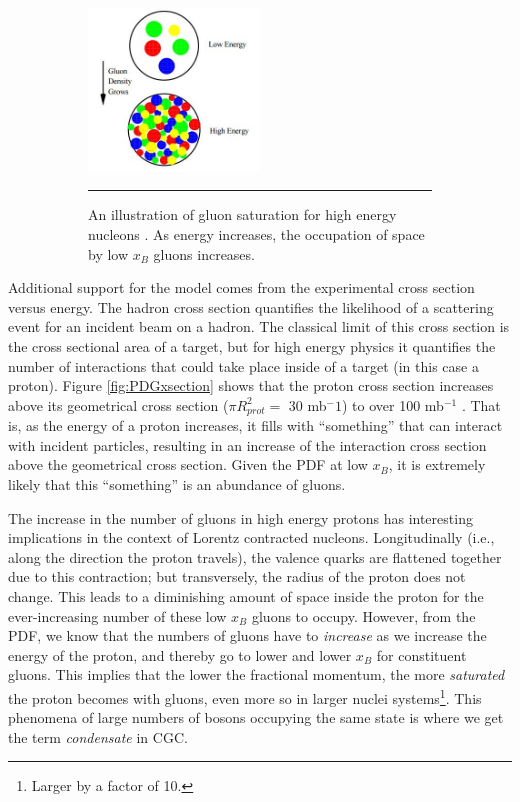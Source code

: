 \begin{figure}
\centering
\ContinuedFloat
\begin{subfigure}[h]{0.8\textwidth}
  \centering
    \includegraphics[width=0.5\textwidth]{Figures/gluondensityCGC.jpg}
  \caption[Illustration of gluon saturation in Color-Glass Condensate.]{An illustration of gluon saturation for high energy nucleons \citep{McLerran:2001sr}. As energy increases, the occupation of space by low $x_{B}$ gluons increases.}
  \label{fig:gluonsaturation}
    \rule{35em}{0.5pt}
\end{subfigure}
\caption{}
\end{figure}

Additional support for the model comes from the experimental cross section versus energy. The hadron cross section quantifies the likelihood of a scattering event for an incident beam on a hadron. The classical limit of this cross section is the cross sectional area of a target, but for high energy physics it quantifies the number of interactions that could take place inside of a target (in this case a proton). Figure \ref{fig:PDGxsection} shows that the proton cross section increases above its geometrical cross section ($\pi R_{prot}^2 =$ 30 mb${^-1}$) to over 100 mb$^{-1}$ \citep{PDGcrosssection}\citep{Itakura2012}. That is, as the energy of a proton increases, it fills with ``something'' that can interact with incident particles, resulting in an increase of the interaction cross section above the geometrical cross section. Given the PDF at low \textit{$x_{B}$}, it is extremely likely that this ``something'' is an abundance of gluons.

The increase in the number of gluons in high energy protons has interesting implications in the context of Lorentz contracted nucleons. Longitudinally (i.e., along the direction the proton travels), the valence quarks are flattened together due to this contraction; but transversely, the radius of the proton does not change. This leads to a diminishing amount of space inside the proton for the ever-increasing number of these low \textit{$x_{B}$} gluons to occupy. However, from the PDF, we know that the numbers of gluons have to \textit{increase} as we increase the energy of the proton, and thereby go to lower and lower \textit{$x_{B}$} for constituent gluons. This implies that the lower the fractional momentum, the more \textit{saturated} the proton becomes with gluons, even more so in larger nuclei systems\footnote{Larger by a factor of 10.}. This phenomena of large numbers of bosons occupying the same state is where we get the term \textit{condensate} in CGC.

